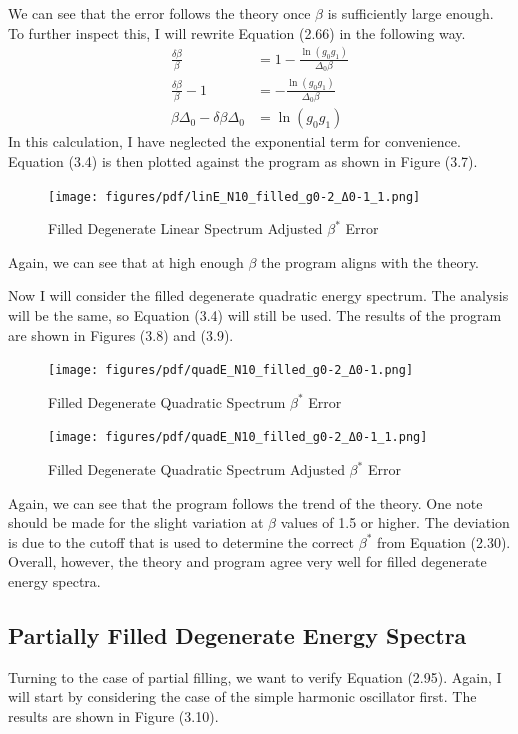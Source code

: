 We can see that the error follows the theory once $\beta$ is sufficiently large enough. To further inspect this, I will rewrite Equation (2.66) in the following way. 
\begin{align}
    \frac{\delta\beta}{\beta}&=1-\frac{\ln(g_0g_1)}{\Delta_0\beta}\\
    \frac{\delta\beta}{\beta}-1&=-\frac{\ln(g_0g_1)}{\Delta_0\beta}\\
    \beta\Delta_0-\delta\beta\Delta_0&=\ln(g_0g_1)
\end{align}
In this calculation, I have neglected the exponential term for convenience. Equation (3.4) is then plotted against the program as shown in Figure (3.7). 
\begin{figure}[H]
    \centering
    \texttt{[image: figures/pdf/linE\_N10\_filled\_g0-2\_Δ0-1\_1.png]}
    \caption{Filled Degenerate Linear Spectrum Adjusted $\beta^*$ Error}
    \label{fig:FilledDegenerateLinearSpectrumAdjustedError}
\end{figure}
Again, we can see that at high enough $\beta$ the program aligns with the theory. 

Now I will consider the filled degenerate quadratic energy spectrum. The analysis will be the same, so Equation (3.4) will still be used. The results of the program are shown in Figures (3.8) and (3.9). 

\begin{figure}[H]
    \centering
    \texttt{[image: figures/pdf/quadE\_N10\_filled\_g0-2\_Δ0-1.png]}
    \caption{Filled Degenerate Quadratic Spectrum $\beta^*$ Error}
    \label{fig:FilledDegenerate}
\end{figure}

\begin{figure}[H]
    \centering
    \texttt{[image: figures/pdf/quadE\_N10\_filled\_g0-2\_Δ0-1\_1.png]}
    \caption{Filled Degenerate Quadratic Spectrum Adjusted $\beta^*$ Error}
    \label{fig:FilledDegenerate2}
\end{figure}

Again, we can see that the program follows the trend of the theory. One note should be made for the slight variation at $\beta$ values of 1.5 or higher. The deviation is due to the cutoff that is used to determine the correct $\beta^*$ from Equation (2.30). Overall, however, the theory and program agree very well for filled degenerate energy spectra.

\subsection{Partially Filled Degenerate Energy Spectra}
Turning to the case of partial filling, we want to verify Equation (2.95). Again, I will start by considering the case of the simple harmonic oscillator first. The results are shown in Figure (3.10). 

